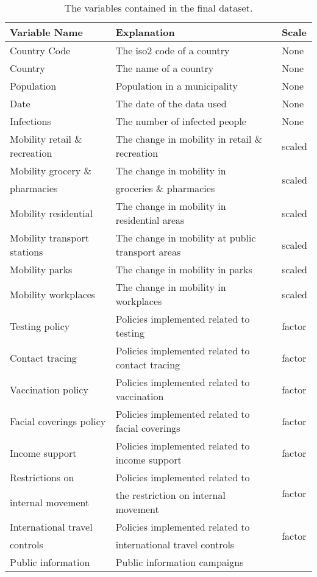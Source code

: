\begin{table}[H] 
\caption{The variables contained in the final dataset.\label{datasetTimeseries}}
\begin{tabular}{l l l}
\toprule
\textbf{Variable Name}	& \textbf{Explanation}	& \textbf{Scale}\\
\midrule
Country Code & The iso2 code of a country & None \\
Country & The name of a country & None \\
Population & Population in a municipality & None \\
Date & The date of the data used & None \\
Infections & The number of infected people & None \\
Mobility retail \& recreation & The change in mobility in retail \& recreation & scaled \\
Mobility grocery \&& The change in mobility in & \multirow{2}{*}{scaled} \\
pharmacies & groceries \& pharmacies \\
Mobility residential & The change in mobility in residential areas & scaled \\
Mobility transport stations  & The change in mobility at public transport areas & scaled \\
Mobility parks  & The change in mobility in parks & scaled \\
Mobility workplaces  & The change in mobility in workplaces & scaled \\
Testing policy & Policies implemented related to testing & factor \\
Contact tracing & Policies implemented related to contact tracing & factor \\
Vaccination policy & Policies implemented related to vaccination & factor \\
Facial coverings policy & Policies implemented related to facial coverings & factor \\
Income support & Policies implemented related to income support & factor \\
Restrictions on  & Policies implemented related to &  \multirow{2}{*}{factor} \\
internal movement & the restriction on internal movement \\
International travel & Policies implemented related to& \multirow{2}{*}{factor} \\
controls & international travel controls \\
Public information & Public information campaigns \multirow{2}{*}{factor} \\

\end{tabular}
\end{table}
